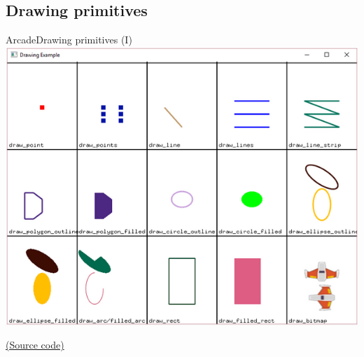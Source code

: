 \documentclass[10pt,compress]{beamer} %
\begin{document}
\subsection{Drawing primitives}
\begin{frame}{Arcade}{Drawing primitives (I)}
	\centering \includegraphics[width=0.7\linewidth]{figs/primitives.png} \\
    \bigskip

    \href{https://api.arcade.academy/en/latest/examples/drawing_primitives.html}{(Source code)}
\end{frame}
\end{document}
